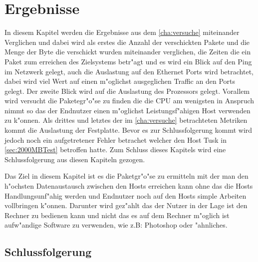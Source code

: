 \chapter{Ergebnisse}
In diesem Kapitel werden die Ergebnisse aus dem \cref{cha:versuche} miteinander Verglichen %
und dabei wird als erstes die Anzahl der verschickten Pakete und die Menge der Byte die %
verschickt wurden miteinander verglichen, die Zeiten die ein Paket zum erreichen des %
Zielsystems betr"agt und es wird ein Blick auf den Ping im Netzwerk gelegt, auch die Auslastung %
auf den Ethernet Ports wird betrachtet, dabei wird viel Wert auf einen m"oglichst ausgeglichen %
Traffic an den Ports gelegt. Der zweite Blick wird auf die Auslastung des Prozessors gelegt. %
Vorallem wird versucht die Paketegr"o"se zu finden die die CPU am wenigsten in Anspruch nimmt %
so das der Endnutzer einen m"oglichst Leistungsf"ahigen Host verwenden zu k"onnen. Als drittes %
und letztes der im \cref{cha:versuche} betrachteten Metriken kommt die Auslastung der Festplatte. %
Bevor es zur Schlussfolgerung kommt wird jedoch noch ein aufgetretener Fehler betrachet welcher den %
Host Tusk in \cref{sec:2000MBTest} betroffen hatte. Zum Schluss dieses Kapitels wird eine Schlussfolgerung %
aus diesen Kapiteln gezogen. %

Das Ziel in diesem Kapitel ist es die Paketgr"o"se zu ermitteln mit der man den h"ochsten Datenaustausch zwischen den %
Hosts erreichen kann ohne das die Hosts Handlungsunf"ahig werden und Endnutzer noch auf %
den Hosts simple Arbeiten vollbringen k"onnen. Darunter wird gez"ahlt das der Nutzer in der %
Lage ist den Rechner zu bedienen kann und nicht das es auf dem Rechner m"oglich ist aufw"andige Software %
zu verwenden, wie z.B: Photoshop oder "ahnliches.  






\section{Schlussfolgerung}
